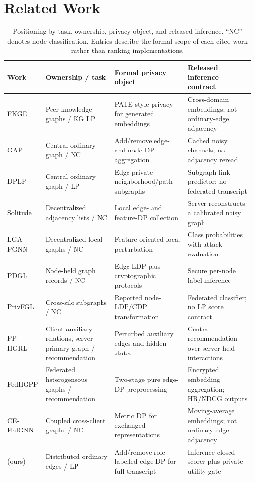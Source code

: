 \section{Related Work}
\label{sec:related}

\begin{table}[t]
\caption{Positioning by task, ownership, privacy object, and released
inference. ``NC'' denotes node classification. Entries describe the formal
scope of each cited work rather than ranking implementations.}
\label{tab:landscape}
\centering
\footnotesize
\setlength{\tabcolsep}{4pt}
\begin{tabular}{p{}p{}p{}p{}}
\toprule
Work & Ownership / task & Formal privacy object & Released inference contract\\
\midrule
FKGE \cite{peng2021fkge}
& Peer knowledge graphs / KG LP
& PATE-style privacy for generated embeddings
& Cross-domain embeddings; not ordinary-edge adjacency\\
GAP \cite{sajadmanesh2023gap}
& Central ordinary graph / NC
& Add/remove edge- and node-DP aggregation
& Cached noisy channels; no adjacency reread\\
DPLP \cite{ran2024dplp}
& Central ordinary graph / LP
& Edge-private neighborhood/path subgraphs
& Subgraph link predictor; no federated transcript\\
Solitude \cite{lin2022solitude}
& Decentralized adjacency lists / NC
& Local edge- and feature-DP collection
& Server reconstructs a calibrated noisy graph\\
LGA-PGNN \cite{pei2024lga}
& Decentralized local graphs / NC
& Feature-oriented local perturbation
& Class probabilities with attack evaluation\\
PDGL \cite{li2025pdgl}
& Node-held graph records / NC
& Edge-LDP plus cryptographic protocols
& Secure per-node label inference\\
PrivFGL \cite{zhang2025privfgl}
& Cross-silo subgraphs / NC
& Reported node-LDP/CDP transformation
& Federated classifier; no LP score contract\\
PP-HGRL \cite{wang2026pphgrl}
& Client auxiliary relations, server primary graph / recommendation
& Perturbed auxiliary edges and hidden states
& Central recommendation over server-held interactions\\
FedHGPP \cite{li2026fedhgpp}
& Federated heterogeneous graphs / recommendation
& Two-stage pure edge-DP preprocessing
& Encrypted embedding aggregation; HR/NDCG outputs\\
CE-FedGNN \cite{guo2026cefedgnn}
& Coupled cross-client graphs / NC
& Metric DP for exchanged representations
& Moving-average embeddings; not ordinary-edge adjacency\\
\method{} (ours)
& Distributed ordinary edges / LP
& Add/remove role-labelled edge DP for full transcript
& Inference-closed scorer plus private utility gate\\
\bottomrule
\end{tabular}
\end{table}


